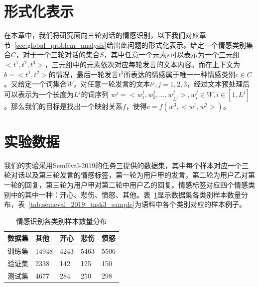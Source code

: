 \section{形式化表示}
\label{sec:exp_context_emo_format}

在本章中，我们将研究面向三轮对话的情感识别，以下我们对应章节~\ref{sec:global_problem_analysis}给出此问题的形式化表示。给定一个情感类别集合$C$，对于一个三轮对话的集合$S$，其中任意一个元素$s$可以表示为一个三元组$<t^1, t^2, t^3>$，三元组中的元素依次对应每轮发言的文本内容。而在上下文为$b=<t^1, t^2>$的情况，最后一轮发言$t^3$所表达的情感属于唯一一种情感类别$c \in C$。又给定一个词集合$W$，对任意一轮发言的文本$t^j, j=1,2,3$，经过文本预处理后可以表示为一个长度为$L^j$的词序列 $w^j = <w^j_1, w^j_2, ..., w^j_{L^j}>, w^j_i \in W, i \in [1, L^j]$。那么我们的目标是找出一个映射关系$f$，使得$c=f(w^3, <w^1, w^2>)$。

\section{实验数据}
\label{sec:exp_context_emo_data}

我们的实验采用SemEval-2019的任务三提供的数据集，其中每个样本对应一个三轮对话以及第三轮发言的情感标签，第一轮为用户甲的发言，第二轮为用户乙对第一轮的回复，第三轮为用户甲对第二轮中用户乙的回复。情感标签对应四个情感类别中的其中一种：开心、悲伤、愤怒、其他。表~\ref{tab:semeval_2019_task3_data}显示数据集各类别样本数量分布，表~\ref{tab:semeval_2019_task3_sample}为语料中各个类别对应的样本例子。

\begin{table}[htb]
  \centering
  \begin{minipage}[t]{0.8\linewidth}
  \caption{情感识别各类别样本数量分布}
  \label{tab:semeval_2019_task3_data}
    \begin{tabularx}{\linewidth}{X|XXXX}
    \toprule[1.5pt]
    数据集 & 其他 & 开心 & 悲伤 & 愤怒 \\  
    \hline
    训练集 & 14948 & 4243 & 5463 & 5506 \\
    验证集 & 2338 & 142 & 125 & 150 \\
    测试集 & 4677 & 284 & 250 & 298 \\
    \bottomrule[1.5pt]
    \end{tabularx}
  \end{minipage}
\end{table}

